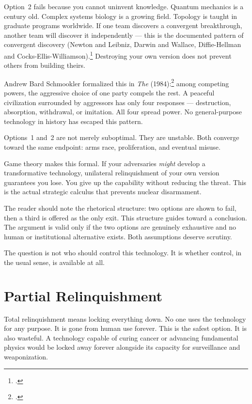 Option~2 fails because you cannot uninvent knowledge. Quantum mechanics is a century old. Complex systems biology is a growing field. Topology is taught in graduate programs worldwide. If one team discovers a convergent breakthrough, another team will discover it independently --- this is the documented pattern of convergent discovery (Newton and Leibniz, Darwin and Wallace, Diffie-Hellman and Cocks-Ellis-Williamson).\footcite{merton1961} Destroying your own version does not prevent others from building theirs.

Andrew Bard Schmookler formalized this in \textit{The } (1984):\footcite{schmookler1984} among competing powers, the aggressive choice of one party compels the rest. A peaceful civilization surrounded by aggressors has only four responses --- destruction, absorption, withdrawal, or imitation. All four spread power. No general-purpose technology in history has escaped this pattern.

Options~1 and~2 are not merely suboptimal. They are unstable. Both converge toward the same endpoint: arms race, proliferation, and eventual misuse.

Game theory makes this formal. If your adversaries \textit{might} develop a transformative technology, unilateral relinquishment of your own version guarantees you lose. You give up the capability without reducing the threat. This is the actual strategic calculus that prevents nuclear disarmament.

The reader should note the rhetorical structure: two options are shown to fail, then a third is offered as the only exit. This structure guides toward a conclusion. The argument is valid only if the two options are genuinely exhaustive and no human or institutional alternative exists. Both assumptions deserve scrutiny.

The question is not who should control this technology. It is whether control, in the usual sense, is available at all.

\section*{Partial Relinquishment}
\label{spine:wr-partial-relinquishment}

Total relinquishment means locking everything down. No one uses the technology for any purpose. It is gone from human use forever. This is the safest option. It is also wasteful. A technology capable of curing cancer or advancing fundamental physics would be locked away forever alongside its capacity for surveillance and weaponization.

